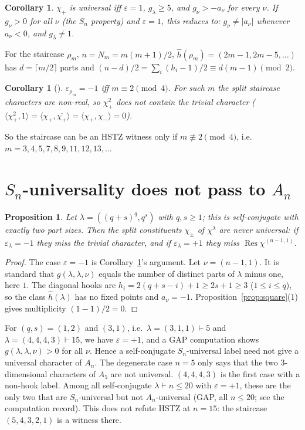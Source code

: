 \documentclass[11pt]{amsart}
\newtheorem{proposition}[theorem]{Proposition}
\newtheorem{corollary}[theorem]{Corollary}
\theoremstyle{remark}
\newcommand{\Res}{\operatorname{Res}}
\begin{document}
\begin{corollary}\label{cor:crit}
$\chi_+$ is universal iff $\varepsilon=1$, $g_\lambda\ge5$, and $g_\nu>-a_\nu$ for every
$\nu$. If $g_\nu>0$ for all $\nu$ (the $S_n$ property) and $\varepsilon=1$, this reduces to:
$g_\nu\ne|a_\nu|$ whenever $a_\nu<0$, and $g_\lambda\ne1$.
\end{corollary}

For the staircase $\rho_m$, $n=N_m=m(m+1)/2$, $\hat h(\rho_m)=(2m-1,2m-5,\dots)$ has
$d=\lceil m/2\rceil$ parts and $(n-d)/2=\sum_i(h_i-1)/2\equiv d(m-1)\pmod 2$.

\begin{corollary}[{\cite[Cor.~6.2]{BBow}}]\label{cor:mod4}
$\varepsilon_{\rho_m}=-1$ iff $m\equiv2\pmod4$. For such $m$ the split staircase characters
are non-real, so $\chi_+^2$ does not contain the trivial character
($\langle\chi_+^2,1\rangle=\langle\chi_+,\overline{\chi_+}\rangle=\langle\chi_+,\chi_-\rangle=0$).
\end{corollary}

So the staircase can be an HSTZ witness only if $m\not\equiv2\pmod4$, i.e.
$m=3,4,5,7,8,9,11,12,13,\dots$

\section{$S_n$-universality does not pass to $A_n$}

\begin{proposition}\label{prop:counter}
Let $\lambda=((q+s)^q,q^s)$ with $q,s\ge1$; this is self-conjugate with exactly two part
sizes. Then the split constituents $\chi_\pm$ of $\chi^\lambda$ are never universal: if
$\varepsilon_\lambda=-1$ they miss the trivial character, and if $\varepsilon_\lambda=+1$
they miss $\Res\chi^{(n-1,1)}$.
\end{proposition}
\begin{proof}
The case $\varepsilon=-1$ is Corollary~\ref{cor:mod4}'s argument. Let $\nu=(n-1,1)$. It is
standard that $g(\lambda,\lambda,\nu)$ equals the number of distinct parts of $\lambda$
minus one, here $1$. The diagonal hooks are $h_i=2(q+s-i)+1\ge 2s+1\ge3$ ($1\le i\le q$), so the class
$\hat h(\lambda)$ has no fixed points and $a_\nu=-1$. Proposition~\ref{prop:square}(1)
gives multiplicity $(1-1)/2=0$.
\end{proof}

For $(q,s)=(1,2)$ and $(3,1)$, i.e.\ $\lambda=(3,1,1)\vdash5$ and $\lambda=(4,4,4,3)\vdash15$,
we have $\varepsilon=+1$, and a GAP computation shows $g(\lambda,\lambda,\nu)>0$ for all
$\nu$. Hence a self-conjugate $S_n$-universal label need not give a universal character of
$A_n$. The degenerate case $n=5$ only says that the two $3$-dimensional characters of $A_5$
are not universal. $(4,4,4,3)$ is the first case with a non-hook label. Among all
self-conjugate $\lambda\vdash n\le 20$ with $\varepsilon=+1$, these are the only two that
are $S_n$-universal but not $A_n$-universal (GAP, all $n\le20$; see the computation
record). This does not refute HSTZ at $n=15$: the staircase $(5,4,3,2,1)$ is a witness there.
\end{document}
